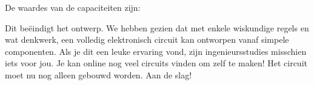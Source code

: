 \documentclass{article}
\begin{document}
		De waardes van de capaciteiten zijn:
		\begin{center}
			 			\noindent {}
		\end{center}

		Dit be\"eindigt het ontwerp. We hebben gezien dat met enkele wiskundige regels en wat denkwerk, een volledig elektronisch circuit kan ontworpen vanaf simpele componenten. Als je dit een leuke ervaring vond, zijn ingenieursstudies misschien iets voor jou. Je kan online nog veel circuits vinden om zelf te maken!
		Het circuit moet nu nog alleen gebouwd worden. Aan de slag! 
		



\end{document}
